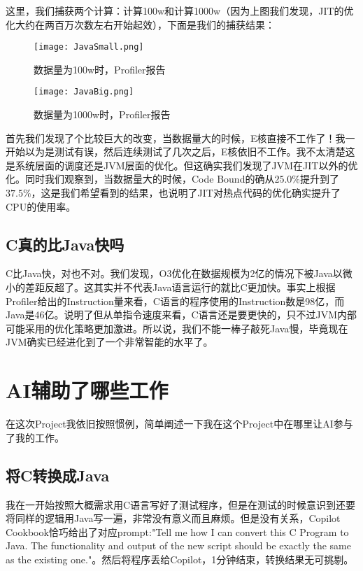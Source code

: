 \documentclass[11pt]{article}
\begin{document}
这里，我们捕获两个计算：计算100w和计算1000w（因为上图我们发现，JIT的优化大约在两百万次数左右开始起效），下面是我们的捕获结果：


\begin{figure}[H]
  \centering
  \begin{minipage}[b]{0.45\textwidth}
    \centering
    \texttt{[image: JavaSmall.png]}
  \caption{数据量为100w时，Profiler报告}
    \label{fig:image1}
  \end{minipage}
  \hfill %
  \begin{minipage}[b]{0.45\textwidth}
    \centering
    \texttt{[image: JavaBig.png]}
  \caption{数据量为1000w时，Profiler报告}
    \label{fig:image2}
  \end{minipage}
\end{figure}


首先我们发现了个比较巨大的改变，当数据量大的时候，E核直接不工作了！我一开始以为是测试有误，然后连续测试了几次之后，E核依旧不工作。我不太清楚这是系统层面的调度还是JVM层面的优化。但这确实我们发现了JVM在JIT以外的优化。同时我们观察到，当数据量大的时候，Code Bound的确从$25.0\%$提升到了$37.5\%$，这是我们希望看到的结果，也说明了JIT对热点代码的优化确实提升了CPU的使用率。
\subsection{C真的比Java快吗}
C比Java快，对也不对。我们发现，O3优化在数据规模为2亿的情况下被Java以微小的差距反超了。这其实并不代表Java语言运行的就比C更加快。事实上根据Profiler给出的Instruction量来看，C语言的程序使用的Instruction数是98亿，而Java是46亿。说明了但从单指令速度来看，C语言还是要更快的，只不过JVM内部可能采用的优化策略更加激进。所以说，我们不能一棒子敲死Java慢，毕竟现在JVM确实已经进化到了一个非常智能的水平了。

\section{AI辅助了哪些工作}
在这次Project我依旧按照惯例，简单阐述一下我在这个Project中在哪里让AI参与了我的工作。
\subsection{将C转换成Java}
我在一开始按照大概需求用C语言写好了测试程序，但是在测试的时候意识到还要将同样的逻辑用Java写一遍，非常没有意义而且麻烦。但是没有关系，Copilot Cookbook恰巧给出了对应prompt:"Tell me how I can convert this C Program to Java. The functionality and output of the new script should be exactly the same as the existing one."。然后将程序丢给Copilot，1分钟结束，转换结果无可挑剔。
\end{document}
